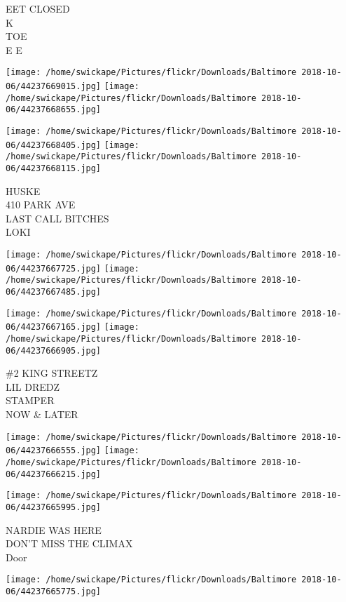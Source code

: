 \documentclass[10pt,letterpaper]{article}
\begin{document}
EET CLOSED\\
K\\
TOE\\
E E\\
\pagebreak

\texttt{[image: /home/swickape/Pictures/flickr/Downloads/Baltimore 2018-10-06/44237669015.jpg]}
\texttt{[image: /home/swickape/Pictures/flickr/Downloads/Baltimore 2018-10-06/44237668655.jpg]}

\texttt{[image: /home/swickape/Pictures/flickr/Downloads/Baltimore 2018-10-06/44237668405.jpg]}
\texttt{[image: /home/swickape/Pictures/flickr/Downloads/Baltimore 2018-10-06/44237668115.jpg]}

HUSKE\\
410 PARK AVE\\
LAST CALL BITCHES\\
LOKI\\
\pagebreak

\texttt{[image: /home/swickape/Pictures/flickr/Downloads/Baltimore 2018-10-06/44237667725.jpg]}
\texttt{[image: /home/swickape/Pictures/flickr/Downloads/Baltimore 2018-10-06/44237667485.jpg]}

\texttt{[image: /home/swickape/Pictures/flickr/Downloads/Baltimore 2018-10-06/44237667165.jpg]}
\texttt{[image: /home/swickape/Pictures/flickr/Downloads/Baltimore 2018-10-06/44237666905.jpg]}

\#2 KING STREETZ\\
LIL DREDZ\\
STAMPER\\
NOW \& LATER\\
\pagebreak

\texttt{[image: /home/swickape/Pictures/flickr/Downloads/Baltimore 2018-10-06/44237666555.jpg]}
\texttt{[image: /home/swickape/Pictures/flickr/Downloads/Baltimore 2018-10-06/44237666215.jpg]}

\texttt{[image: /home/swickape/Pictures/flickr/Downloads/Baltimore 2018-10-06/44237665995.jpg]}

NARDIE WAS HERE\\
DON'T MISS THE CLIMAX\\
Door\\
\pagebreak

\texttt{[image: /home/swickape/Pictures/flickr/Downloads/Baltimore 2018-10-06/44237665775.jpg]}
\end{document}
